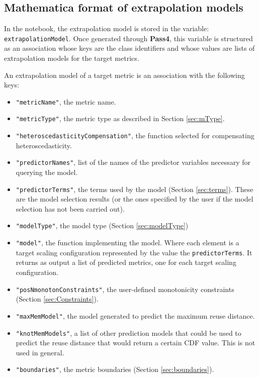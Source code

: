 \documentclass[a4paper, 10pt]{article}
\begin{document}
\subsection{Mathematica format of extrapolation models}
\label{apx:extrapolationModel}

In the \ex notebook, the extrapolation model is stored in the variable: \texttt{extrapolationModel}.
Once generated through \textbf{Pass4}, this variable is structured as an association whose keys are
the class identifiers and whose values are lists of extrapolation models for the target metrics.

An extrapolation model of a target metric is an association with the following keys:
\begin{itemize}
 \item \verb!"metricName"!, the metric name.
 \item \verb!"metricType"!, the metric type as described in Section \ref{sec:mType}.
 \item \verb!"heteroscedasticityCompensation"!, the function selected for compensating heteroscedasticity.
 \item \verb!"predictorNames"!, list of the names of the predictor variables necessary for querying the model.
 \item \verb!"predictorTerms"!, the terms used by the model (Section \ref{sec:terms}). These are the model selection results
 (or the ones specified by the user if the model selection has not been carried out).
 \item \verb!"modelType"!, the model type (Section \ref{sec:modelType})
 \item \verb!"model"!, the function implementing the model.
 Where each element is a target scaling configuration represented by the value the \verb!predictorTerms!.
 It returns as output a list of predicted metrics, one for each target scaling configuration.
 \item \verb!"posNmonotonConstraints"!, the user-defined monotonicity constraints (Section \ref{sec:Constraints}).
 \item \verb!"maxMemModel"!, the model generated to predict the maximum reuse distance.
 \item \verb!"knotMemModels"!, a list of other prediction models that could be used to predict the reuse distance that
 would return a certain CDF value. This is not used in general.
 \item \verb!"boundaries"!, the metric boundaries (Section \ref{sec:boundaries}).
\end{itemize}
\end{document}
